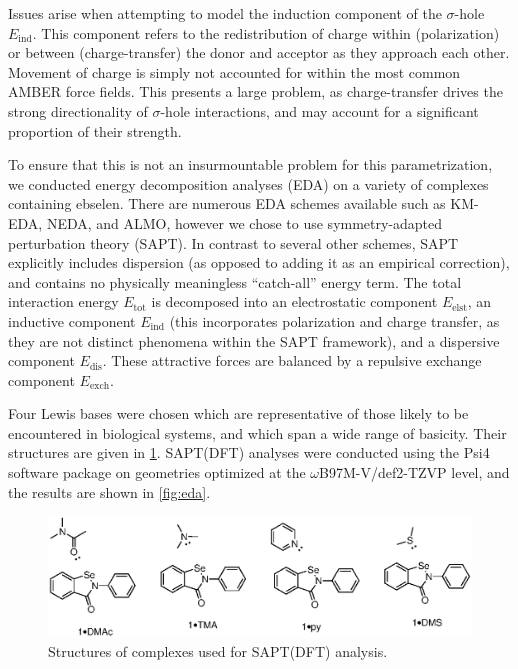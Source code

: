 \begin{refsection}
Issues arise when attempting to model the induction component of the $ \sigma $-hole $ E_{\mathrm{ind}} $.
This component refers to the redistribution of charge within (polarization) or between (charge-transfer) the donor and acceptor as they approach each other.
Movement of charge is simply not accounted for within the most common AMBER force fields.
This presents a large problem, as charge-transfer drives the strong directionality of $ \sigma $-hole interactions, and may account for a significant proportion of their strength.

To ensure that this is not an insurmountable problem for this parametrization, we conducted energy decomposition analyses (EDA) on a variety of complexes containing ebselen.
There are numerous EDA schemes available such as KM-EDA, NEDA, and ALMO, however we chose to use symmetry-adapted perturbation theory (SAPT).\autocite{SAPT2020,Jeziorski1994PerturbationComplexes}
In contrast to several other schemes, SAPT explicitly includes dispersion (as opposed to adding it as an empirical correction), and contains no physically meaningless ``catch-all'' energy term.
The total interaction energy $ E_\mathrm{tot} $ is decomposed into an electrostatic component $ E_\mathrm{elst} $, an inductive component $ E_\mathrm{ind} $ (this incorporates polarization and charge transfer, as they are not distinct phenomena within the SAPT framework), and a dispersive component $ E_\mathrm{dis} $.
These attractive forces are balanced by a repulsive exchange component $ E_\mathrm{exch} $.

Four Lewis bases were chosen which are representative of those likely to be encountered in biological systems, and which span a wide range of basicity.
Their structures are given in \cref{fig:complexes}.
SAPT(DFT) analyses were conducted using the Psi4 software package on geometries optimized at the $ \omega $B97M-V/def2-TZVP level, and the results are shown in \cref{fig:eda}.\autocite{Parrish2017}

\begin{figure}
    \centering
    \includegraphics[scale=0.74]{Figures/sapt-complexes.eps}
    \caption{Structures of complexes used for SAPT(DFT) analysis.}\label{fig:complexes}
\end{figure}


\end{refsection}
